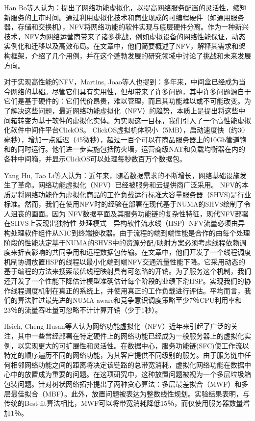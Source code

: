 Han Bo等人认为：提出了网络功能虚拟化，以提高网络服务配置的灵活性，缩短新服务的上市时间。通过利用虚拟化技术和商业现成的可编程硬件（如通用服务器，存储和交换机），NFV将网络功能的软件实现与底层硬件分离。作为一种新兴技术，NFV为网络运营商带来了诸多挑战，例如虚拟设备的网络性能保证，动态实例化和迁移以及高效布局。在文章中，他们简要概述了NFV，解释其需求和架构框架，介绍了几个用例，并在这个蓬勃发展的研究领域中讨论了挑战和未来发展方向。

对于实现高性能的NFV，Martins, Joao等人也提到：多年来，中间盒已经成为当今网络的基础。尽管它们具有实用性，但却带来了许多问题，其中许多问题源自于它们是基于硬件的：它们代价昂贵，难以管理，而且其功能难以或不可能改变。为了解决这些问题，最近网络功能虚拟化（NFV）的趋势，本质上是提出将这些中间箱转变为基于软件的虚拟化实体。为实现这一目标，我们引入了一个高性能虚拟化软件中间件平台ClickOS。 ClickOS虚拟机体积小（5MB），启动速度快（约30毫秒），增加一点延迟（45微秒），超过一百个可以在商品服务器上的10Gb管道饱和的同时运行。他们进一步实施包括防火墙，运营商级NAT和负载均衡器在内的各种中间箱，并显示ClickOS可以处理每秒数百万个数据包。

Yang Hu, Tao Li等人认为：近年来，随着数据需求的不断增长，网络基础设施发生了革命。网络功能虚拟化（NFV）已经被服务和云提供商广泛采用。 NFV的本质是将网络功能作为虚拟化商品的工作负载运行标准大容量服务器（SHVS)是行业标准。然而，我们在使用NFV时的经验在部署在现代基于NUMA的SHVS绘制了令人沮丧的画面。因为
NFV数据平面及其服务功能链的复杂性特征，现代NFV部署在SHVS上表现出独特性
处理模式 - 异构软件流水线（HSP）NFV流量必须由异构处理软件组件从NIC到终端接收器。由于流程的端到端性能是合作的由每个处理阶段的性能决定基于NUMA的SHVS中的资源分配/映射方案必须考虑线程依赖调度来折衷影响的共同争用和远程数据包传输。在文章中，他们开发了一个线程调度机制协调放置HSP的线程以最小化端到端NFV交通流量性能下降。它采用动态的基于编程的方法来搜索最优线程映射具有可忽略的开销。为了服务这个机制，我们还开发了一个性能下降估计模型准确估计每个阶段的业绩下滑HSP。实现我们的协作线程调度机制在真正的系统上，并使用真正的工作负载进行评估。平均而言，我们的算法胜过最先进的NUMA aware和竞争意识调度策略至少7％CPU利用率和23％的流量吞吐量可忽略不计计算开销（少于1秒）。

Hsieh, Cheng-Husan等人认为网络功能虚拟化（NFV）近年来引起了广泛的关注，其中一些曾经部署在特定硬件上的网络功能已经成为一般服务器上的虚拟化实例，以实现更大的可扩展性和灵活性。在数据中心，服务功能链(SFC)使工作流以特定的顺序遍历不同的网络功能，为其客户提供不同级别的服务。由于服务链中任何相邻网络功能之间的距离将决定该链路的总带宽消耗，虚拟化网络功能在数据中心中的放置成为重要的问题。在这项研究中，这种放置问题被视为一个多层垃圾箱包装问题。针对树状网络拓扑提出了两种贪心算法：多层最差拟合（MWF）和多层最佳拟合（MBF）。此外，放置问题被表达为整数线性规划。实验结果表明，与传统的Best-fit算法相比，MWF可以将带宽消耗降低15％，而仅使用服务器数量增加1％。


